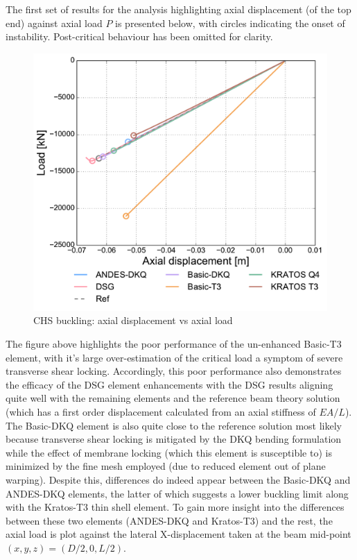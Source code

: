 The first set of results for the analysis highlighting axial displacement (of the top end) against axial load $P$ is presented below, with circles indicating the onset of instability. Post-critical behaviour has been omitted for clarity.

\begin{figure}[H]
	\centering
	\def\svgwidth{\columnwidth}
	\includegraphics[width=12cm]{images/stability_chs_axial_disp.pdf}
	\caption{CHS buckling: axial displacement vs axial load}
	\label{pic:eulerchs1}
\end{figure}

The figure above highlights the poor performance of the un-enhanced Basic-T3 element, with it's large over-estimation of the critical load a symptom of severe transverse shear locking. Accordingly, this poor performance also demonstrates the efficacy of the DSG element enhancements with the DSG results aligning quite well with the remaining elements and the reference beam theory solution (which has a first order displacement calculated from an axial stiffness of $EA/L$). The Basic-DKQ element is also quite close to the reference solution most likely because transverse shear locking is mitigated by the DKQ bending formulation while the effect of membrane locking (which this element is susceptible to) is minimized by the fine mesh employed (due to reduced element out of plane warping). Despite this, differences do indeed appear between the Basic-DKQ and ANDES-DKQ elements, the latter of which suggests a lower buckling limit along with the Kratos-T3 thin shell element. To gain more insight into the differences between these two elements (ANDES-DKQ and Kratos-T3) and the rest, the axial load is plot against the lateral X-displacement taken at the beam mid-point $(x,y,z) = (D/2,0,L/2)$.


